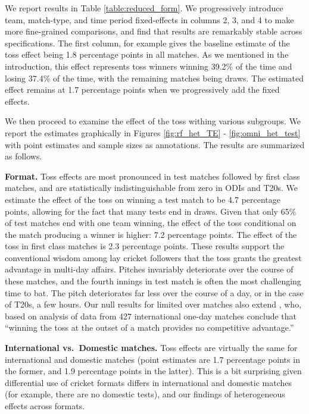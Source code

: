 \documentclass[11pt,  letterpaper]{article}
\begin{document}
We report results in Table \ref{table:reduced_form}. We progressively introduce team, match-type, and time period fixed-effects in columns 2, 3, and 4 to make more fine-grained comparisons, and find that results are remarkably stable across specifications. The first column, for example gives
the baseline estimate of the toss effect being 1.8 percentage points in all matches. As we mentioned in the introduction, this effect represents toss winners winning 39.2\% of the time and losing 37.4\% of the time, with the remaining matches being draws. The estimated effect remains at 1.7 percentage points when we progressively add the fixed effects.

We then proceed to examine the effect of the toss withing various subgroups. We report the estimates graphically in Figures \ref{fig:rf_het_TE} - \ref{fig:omni_het_test} with point estimates and sample sizes as annotations. The results are summarized as follows.

\textbf{Format.} Toss effects are most pronounced in test matches followed by first class matches, and are statistically indistinguishable from zero in ODIs and T20s. We estimate the effect of the toss on winning a test match to be 4.7 percentage points, allowing for the fact that many tests end in draws. Given that only 65\% of test matches end with one team winning, the effect of the toss conditional on the match producing a winner is higher: 7.2 percentage points. The effect of the toss in first class matches is 2.3 percentage points. These results support the conventional wisdom among lay cricket followers that the toss grants the greatest advantage in multi-day affairs. Pitches invariably deteriorate over the course of these matches, and the fourth innings in test match is often the most challenging time to bat. The pitch deteriorates far less over the course of a day, or in the case of T20s, a few hours. Our null results for limited over matches also extend \citet{de1998winning}, who, based on analysis of data from 427 international one-day matches conclude that ``winning the toss at the outset of a match provides no competitive advantage.''

\textbf{International vs.~Domestic matches.} Toss effects are virtually the same for international and domestic matches (point estimates are 1.7 percentage points in the former, and 1.9 percentage points in the latter). This is a bit surprising given differential use of cricket formats differs in international and domestic matches (for example, there are no domestic tests), and our findings of heterogeneous effects across formats. 
\end{document}
